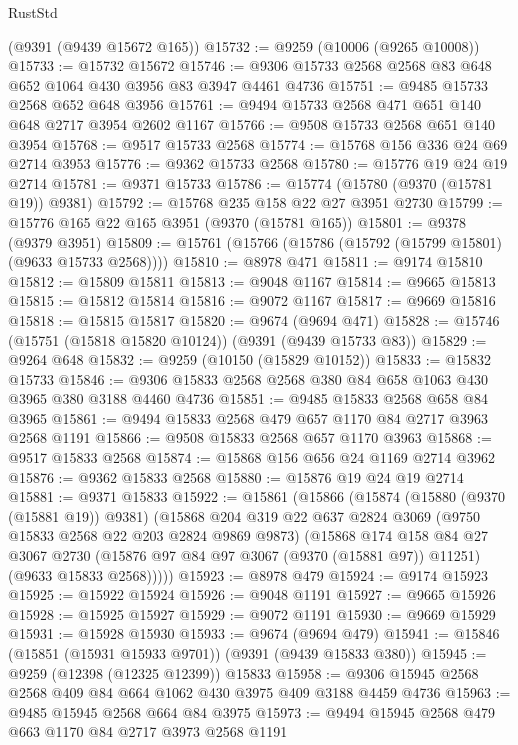 \begin{lexlean}{RustStd}
\begin{coremodule}
    (@9391 (@9439 @15672 @165))
@15732 := @9259 (@10006 (@9265 @10008))
@15733 := @15732 @15672
@15746 := @9306 @15733 @2568 @2568 @83 @648 @652 @1064 @430 @3956 @83 @3947 @4461 @4736
@15751 := @9485 @15733 @2568 @652 @648 @3956
@15761 := @9494 @15733 @2568 @471 @651 @140 @648 @2717 @3954 @2602 @1167
@15766 := @9508 @15733 @2568 @651 @140 @3954
@15768 := @9517 @15733 @2568
@15774 := @15768 @156 @336 @24 @69 @2714 @3953
@15776 := @9362 @15733 @2568
@15780 := @15776 @19 @24 @19 @2714
@15781 := @9371 @15733
@15786 := @15774 (@15780 (@9370 (@15781 @19)) @9381)
@15792 := @15768 @235 @158 @22 @27 @3951 @2730
@15799 := @15776 @165 @22 @165 @3951 (@9370 (@15781 @165))
@15801 := @9378 (@9379 @3951)
@15809 := @15761 (@15766 (@15786 (@15792 (@15799 @15801) (@9633 @15733 @2568))))
@15810 := @8978 @471
@15811 := @9174 @15810
@15812 := @15809 @15811
@15813 := @9048 @1167
@15814 := @9665 @15813
@15815 := @15812 @15814
@15816 := @9072 @1167
@15817 := @9669 @15816
@15818 := @15815 @15817
@15820 := @9674 (@9694 @471)
@15828 := @15746 (@15751 (@15818 @15820 @10124)) (@9391 (@9439 @15733 @83))
@15829 := @9264 @648
@15832 := @9259 (@10150 (@15829 @10152))
@15833 := @15832 @15733
@15846 := @9306 @15833 @2568 @2568 @380 @84 @658 @1063 @430 @3965 @380 @3188 @4460 @4736
@15851 := @9485 @15833 @2568 @658 @84 @3965
@15861 := @9494 @15833 @2568 @479 @657 @1170 @84 @2717 @3963 @2568 @1191
@15866 := @9508 @15833 @2568 @657 @1170 @3963
@15868 := @9517 @15833 @2568
@15874 := @15868 @156 @656 @24 @1169 @2714 @3962
@15876 := @9362 @15833 @2568
@15880 := @15876 @19 @24 @19 @2714
@15881 := @9371 @15833
@15922 := @15861
    (@15866
      (@15874
        (@15880 (@9370 (@15881 @19)) @9381)
        (@15868
          @204
          @319
          @22
          @637
          @2824
          @3069
          (@9750 @15833 @2568 @22 @203 @2824 @9869 @9873)
          (@15868
            @174
            @158
            @84
            @27
            @3067
            @2730
            (@15876 @97 @84 @97 @3067 (@9370 (@15881 @97)) @11251)
            (@9633 @15833 @2568)))))
@15923 := @8978 @479
@15924 := @9174 @15923
@15925 := @15922 @15924
@15926 := @9048 @1191
@15927 := @9665 @15926
@15928 := @15925 @15927
@15929 := @9072 @1191
@15930 := @9669 @15929
@15931 := @15928 @15930
@15933 := @9674 (@9694 @479)
@15941 := @15846 (@15851 (@15931 @15933 @9701)) (@9391 (@9439 @15833 @380))
@15945 := @9259 (@12398 (@12325 @12399)) @15833
@15958 := @9306 @15945 @2568 @2568 @409 @84 @664 @1062 @430 @3975 @409 @3188 @4459 @4736
@15963 := @9485 @15945 @2568 @664 @84 @3975
@15973 := @9494 @15945 @2568 @479 @663 @1170 @84 @2717 @3973 @2568 @1191

\end{coremodule}
\end{lexlean}
